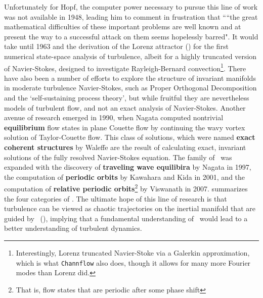 Unfortunately for Hopf, the computer power necessary to pursue this line of work was not available in 1948, leading him to comment in frustration that ``“the great mathematical difficulties of these important problems are well
known and at present the way to a successful attack on them seems hopelessly
barred". It would take until 1963 and the derivation of the Lorenz attractor () for the first numerical state-space analysis of turbulence, albeit for a highly truncated version of Navier-Stokes, designed to investigate Rayleigh-Bernard convection\footnote{Interestingly, Lorenz truncated Navier-Stoke via a Galerkin approximation, which is what {\tt Channflow} also does, though it allows for many more Fourier modes than Lorenz did.}. There have also been a number of efforts to explore the structure of invariant manifolds in moderate turbulence Navier-Stokes, such as Proper Orthogonal Decomposition and the `self-sustaining process theory', but while fruitful they are nevertheless models of turbulent flow, and not an exact analysis of Navier-Stokes. Another avenue of research emerged in 1990, when Nagata computed nontrivial {\bf equilibrium} flow states in plane Couette flow by continuing the wavy vortex solution of Taylor-Couette flow. This class of solutions, which were named {\bf exact coherent structures} by Waleffe are the result of calculating exact, invariant solutions of the fully resolved Navier-Stokes equation. The family of \ecs~was expanded with the discovery of {\bf traveling wave equilibira} by Nagata in 1997, the computation of {\bf periodic orbits} by Kawahara and Kida in 2001, and the computation of {\bf relative periodic orbits}\footnote{That is, flow states that are periodic after some phase shift} by Viswanath in 2007.  summarizes the four categories of \ecs. The ultimate hope of this line of research is that turbulence can be viewed as chaotic trajectories on the inertial manifold that are guided by \ecs~(), implying that a fundamental understanding of \ecs~would lead to a better understanding of turbulent dynamics.  \\
